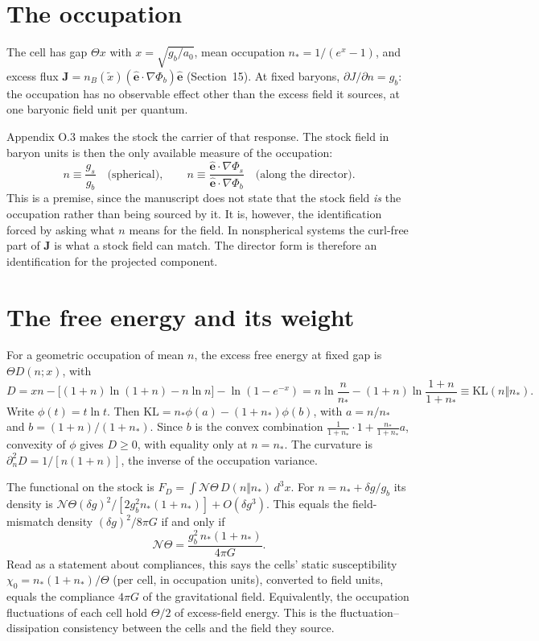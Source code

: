 \section{The occupation}
The cell has gap $\Theta x$ with $x=\sqrt{g_b/a_0}$, mean occupation $n_*=1/(e^x-1)$, and excess flux $\mathbf J=n_B(\widetilde x)(\hat{\mathbf e}\cdot\nabla\Phi_b)\hat{\mathbf e}$ (Section~15). At fixed baryons, $\partial J/\partial n=g_b$: the occupation has no observable effect other than the excess field it sources, at one baryonic field unit per quantum.

Appendix O.3 makes the stock the carrier of that response. The stock field in baryon units is then the only available measure of the occupation:
\[
n\equiv\frac{g_s}{g_b}\quad\text{(spherical)},\qquad
n\equiv\frac{\hat{\mathbf e}\cdot\nabla\Phi_s}{\hat{\mathbf e}\cdot\nabla\Phi_b}\quad\text{(along the director)}.
\]
This is a premise, since the manuscript does not state that the stock field \emph{is} the occupation rather than being sourced by it. It is, however, the identification forced by asking what $n$ means for the field. In nonspherical systems the curl-free part of $\mathbf J$ is what a stock field can match. The director form is therefore an identification for the projected component.

\section{The free energy and its weight}
For a geometric occupation of mean $n$, the excess free energy at fixed gap is $\Theta D(n;x)$, with
\[
D=xn-\big[(1+n)\ln(1+n)-n\ln n\big]-\ln(1-e^{-x})
=n\ln\frac{n}{n_*}-(1+n)\ln\frac{1+n}{1+n_*}\equiv\mathrm{KL}(n\Vert n_*).
\]
Write $\phi(t)=t\ln t$. Then $\mathrm{KL}=n_*\phi(a)-(1+n_*)\phi(b)$, with $a=n/n_*$ and $b=(1+n)/(1+n_*)$. Since $b$ is the convex combination $\tfrac1{1+n_*}\cdot1+\tfrac{n_*}{1+n_*}a$, convexity of $\phi$ gives $D\ge0$, with equality only at $n=n_*$. The curvature is $\partial_n^2D=1/[n(1+n)]$, the inverse of the occupation variance.

The functional on the stock is $F_D=\int\mathcal N\Theta\,D(n\Vert n_*)\,d^3x$. For $n=n_*+\delta g/g_b$ its density is $\mathcal N\Theta(\delta g)^2/[2g_b^2n_*(1+n_*)]+O(\delta g^3)$. This equals the field-mismatch density $(\delta g)^2/8\pi G$ if and only if
\begin{equation}
\mathcal N\Theta=\frac{g_b^2\,n_*(1+n_*)}{4\pi G}.
\end{equation}
Read as a statement about compliances, this says the cells' static susceptibility $\chi_0=n_*(1+n_*)/\Theta$ (per cell, in occupation units), converted to field units, equals the compliance $4\pi G$ of the gravitational field. Equivalently, the occupation fluctuations of each cell hold $\Theta/2$ of excess-field energy. This is the fluctuation--dissipation consistency between the cells and the field they source.

